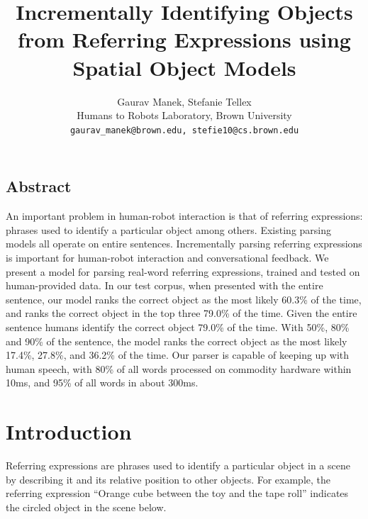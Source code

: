 \documentclass[landscape,a0b]{a0poster}
\title{\Huge Incrementally Identifying Objects from Referring Expressions using Spatial Object Models}
\author{Gaurav Manek, Stefanie Tellex \\ Humans to Robots Laboratory, Brown University \\ \texttt{gaurav\_manek@brown.edu, stefie10@cs.brown.edu}}
\date{}
\numberwithin{equation}{section}
\begin{document}
\setlength{\columnsep}{1in}
\begin{multicols*}{3}
[
\maketitle
]

\titlespacing*{\section}{0pt}{0pt}{7pt}
\thispagestyle{empty}

\begin{framed}
\section{Abstract}
An important problem in human-robot interaction is that of referring expressions: phrases used to identify a particular object among others. Existing parsing models all operate on entire sentences. Incrementally parsing referring expressions is important for human-robot interaction and conversational feedback. We present a model for parsing real-word referring expressions, trained and tested on human-provided data. In our test corpus, when presented with the entire sentence, our model ranks the correct object as the most likely 60.3\% of the time, and ranks the correct object in the top three 79.0\% of the time. Given the entire sentence humans identify the correct object 79.0\% of the time. With 50\%, 80\% and 90\% of the sentence, the model ranks the correct object as the most likely 17.4\%, 27.8\%, and 36.2\% of the time. Our parser is capable of keeping up with human speech, with 80\% of all words processed on commodity hardware within 10ms, and 95\% of all words in about 300ms.
\end{framed}


\section{Introduction}

\begin{large}

Referring expressions are phrases used to identify a particular object in a scene by describing it and its relative position to other objects. For example, the referring expression ``Orange cube between the toy and the tape roll'' indicates the circled object in the scene below. 


\end{large}
\end{multicols*}
\end{document}
